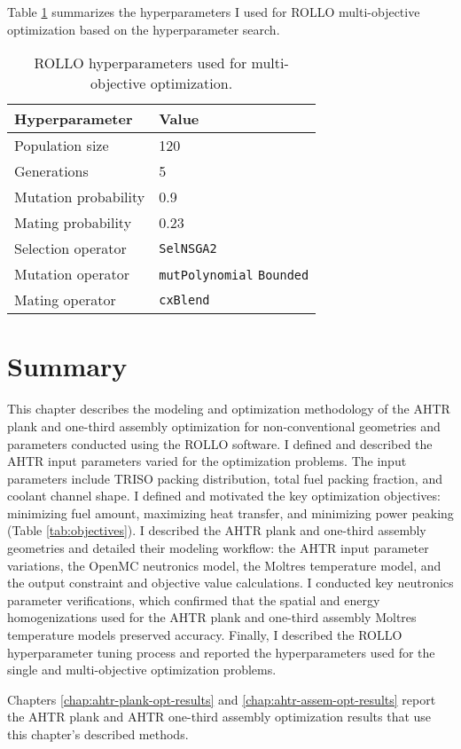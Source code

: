 Table \ref{tab:multi-obj-hyp} summarizes the hyperparameters I used for \gls{ROLLO} 
multi-objective optimization based on the hyperparameter search. 
\begin{table}[htbp]
    \centering
    \onehalfspacing
    \caption{\acrfull{ROLLO} hyperparameters used for multi-objective optimization.}
	\label{tab:multi-obj-hyp}
    \footnotesize
    \begin{tabular}{ll}
    \hline 
    \textbf{Hyperparameter} & \textbf{Value} \\
    \hline 
    Population size & 120 \\
    Generations & 5 \\
    Mutation probability & 0.9 \\
    Mating probability & 0.23 \\
    Selection operator & \texttt{SelNSGA2} \\
    Mutation operator & \texttt{mutPolynomial} \texttt{Bounded} \\
    Mating operator & \texttt{cxBlend} \\
    \hline
    \end{tabular}
\end{table}

\section{Summary}
\glsresetall
This chapter describes the modeling and optimization methodology of the 
\gls{AHTR} plank and one-third assembly optimization for non-conventional 
geometries and parameters conducted using the \gls{ROLLO} software.
I defined and described the \gls{AHTR} input parameters varied for the optimization 
problems. 
The input parameters include \gls{TRISO} packing distribution, total fuel packing 
fraction, and coolant channel shape. 
I defined and motivated the key optimization objectives: minimizing fuel amount,
maximizing heat transfer, and minimizing power peaking (Table \ref{tab:objectives}).
I described the \gls{AHTR} plank and one-third assembly geometries and  
detailed their modeling workflow: the \gls{AHTR} input parameter variations, 
the OpenMC neutronics model, the Moltres temperature model, and 
the output constraint and objective value calculations. 
I conducted key neutronics parameter verifications, which confirmed that the spatial 
and energy homogenizations used for the \gls{AHTR} plank and one-third assembly Moltres 
temperature models preserved accuracy.
Finally, I described the \gls{ROLLO} hyperparameter tuning process and reported the 
hyperparameters used for the single and multi-objective optimization problems. 

Chapters \ref{chap:ahtr-plank-opt-results} and \ref{chap:ahtr-assem-opt-results} 
report the \gls{AHTR} plank and \gls{AHTR} one-third assembly optimization results 
that use this chapter's described methods.